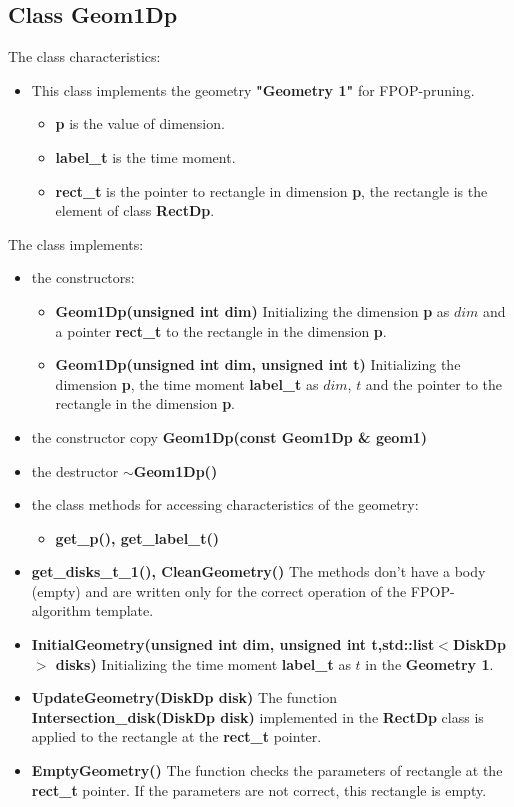 \documentclass{report}
\begin{document}
	\subsection*{Class Geom1Dp}
	\label{Geom1Dp}
	
	The class characteristics: 
	\begin{itemize}
		\item This class implements the geometry {\bfseries "Geometry 1"} for FPOP-pruning. 
		\begin{itemize}
			\item {\bfseries p} is the value of dimension.
			\item {\bfseries label\_t} is the time moment.
			\item {\bfseries rect\_t} is the pointer to rectangle in dimension {\bfseries p}, the rectangle is  the element of class {\bfseries RectDp}.
		\end{itemize}
	\end{itemize}

	The class implements:
	\begin{itemize}	
		\item the constructors:
		\begin{itemize}
			\item {\bfseries Geom1Dp(unsigned  int dim)} 
			Initializing the dimension {\bfseries p} as $dim$  and a pointer {\bfseries rect\_t} to the rectangle in the dimension {\bfseries p}.
			\item {\bfseries Geom1Dp(unsigned int dim, unsigned int t)} 
			Initializing the dimension {\bfseries p}, the time moment {\bfseries label\_t} as $dim$, $t$   and the pointer to the rectangle in the dimension {\bfseries p}.
		\end{itemize}
		\item the constructor copy {\bfseries Geom1Dp(const Geom1Dp \& geom1)} 
		\item the destructor {\bfseries  $\sim$Geom1Dp()}
		\item the class methods for accessing characteristics of the geometry:
		\begin{itemize}
			\item {\bfseries get\_p(), get\_label\_t()}		
		\end{itemize}
		\item{\bfseries get\_disks\_t\_1(), CleanGeometry()}
		The methods don't have a body (empty) and are written only for the correct operation of the FPOP-algorithm template. 
		\item{\bfseries InitialGeometry(unsigned int dim, unsigned int t,std::list$<$DiskDp$>$ disks)}
		Initializing the time moment {\bfseries label\_t} as $t$ in the {\bfseries Geometry 1}. 
		\item {\bfseries UpdateGeometry(DiskDp disk)} 
		The function {\bfseries Intersection\_disk(DiskDp disk)} implemented in the {\bfseries RectDp} class is applied to the rectangle  at the {\bfseries rect\_t} pointer. 
		\item {\bfseries EmptyGeometry()}
		The function checks the parameters of rectangle at the {\bfseries rect\_t} pointer. If the parameters are not correct, this rectangle is empty. 
	
	\end{itemize}
\end{document}
